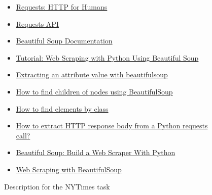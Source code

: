 \begin{figure}
\begin{mdframed}[backgroundcolor=gray!05]
\begin{scriptsize}
\begin{itemize}
    \item \href{https://docs.python-requests.org/en/latest/}{Requests: HTTP for Humans}
    \item \href{https://docs.python-requests.org/en/latest/api/}{Requests API}
    \item \href{https://www.crummy.com/software/BeautifulSoup/bs4/doc/}{Beautiful Soup Documentation}
    \item \href{https://www.dataquest.io/blog/web-scraping-python-using-beautiful-soup/}{Tutorial: Web Scraping with Python Using Beautiful Soup}
    \item \href{https://stackoverflow.com/questions/2612548/extracting-an-attribute-value-with-beautifulsoup}{Extracting an attribute value with beautifulsoup}
    \item \href{https://stackoverflow.com/questions/6287529/how-to-find-children-of-nodes-using-beautifulsoup}{How to find children of nodes using BeautifulSoup}
    \item \href{https://stackoverflow.com/questions/5041008/how-to-find-elements-by-class}{How to find elements by class}
    \item \href{https://stackoverflow.com/questions/9029287/how-to-extract-http-response-body-from-a-python-requests-call}{How to extract HTTP response body from a Python requests call?} 
    \item \href{https://realpython.com/beautiful-soup-web-scraper-python/}{Beautiful Soup: Build a Web Scraper With Python}
    \item \href{https://www.scrapingbee.com/blog/python-web-scraping-beautiful-soup/}{Web Scraping with BeautifulSoup}
\end{itemize}

\end{scriptsize}
\end{mdframed}
\caption{Description for the NYTimes task}
\end{figure}

    